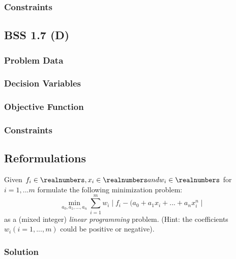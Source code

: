 \documentclass[12pt]{article}
\begin{document}
\subsubsection{Constraints}

\subsection{BSS 1.7 (D)}
\subsubsection{Problem Data}

\subsubsection{Decision Variables}

\subsubsection{Objective Function}

\subsubsection{Constraints}


\subsection{Reformulations}
Given  \( f_i \in \realnumbers, x_i \in \realnumbers and w_i \in \realnumbers \) for \( i = 1,...m \) formulate the following minimization problem:\\
\begin{equation*}
    \min_{a_0,a_1,...,a_n} \sum_{i=1}^{m} w_i \mid f_i -  (a_0 + a_1 x_i + ... + a_nx_i^n \mid
\end{equation*}
as a (mixed integer) \textit{linear programming} problem. (Hint: the coefficients \( w_i (i = 1,...,m) \) could be positive or negative).

\subsubsection{Solution}
\end{document}
